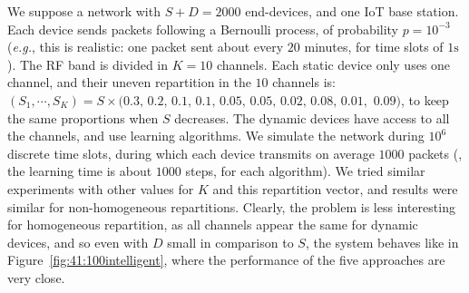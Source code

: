 We suppose a network with $S + D = 2000$ end-devices, and one IoT base station.
Each device sends packets following a Bernoulli process, of probability $p = 10^{-3}$ (\emph{e.g.}, this is realistic: one packet sent about every $20$ minutes, for time slots of $1\mathrm{s}$).
The RF band is divided in $K = 10$ channels.
Each static device only uses one channel, and their uneven repartition in the $10$ channels is: $(S_1,\cdots, S_{K}) = S\times(0.3, \, 0.2, \, 0.1, \, 0.1, \, 0.05, \, 0.05, \, 0.02, \, 0.08, \, 0.01,$ $0.09)$, to keep the same proportions when $S$ decreases. The dynamic devices have access to all the channels, and use learning algorithms.
%
We simulate the network during $10^6$ discrete time slots, during which each device transmits on average $1000$ packets (\ie, the learning time is about $1000$ steps, for each algorithm).
We tried similar experiments with other values for $K$ and this repartition vector, and results were similar for non-homogeneous repartitions. Clearly, the problem is less interesting for homogeneous repartition, as all channels appear the same for dynamic devices, and so even with $D$ small in comparison to $S$, the system behaves like in Figure~\ref{fig:41:100intelligent}, where the performance of the five approaches are very close.

